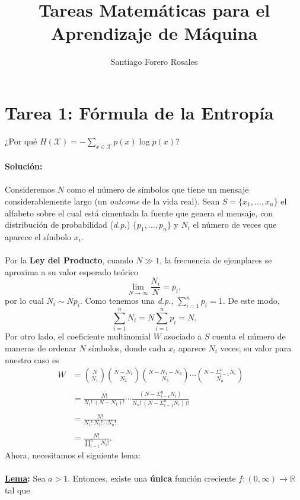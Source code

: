 \documentclass{article}
\title{Tareas Matemáticas para el Aprendizaje de Máquina}
\author{Santiago Forero Rosales}
\begin{document}
\maketitle
\tableofcontents
\newpage
\section{Tarea 1: Fórmula de la Entropía}
¿Por qué $H(\mathcal X) = - \sum_{x \in \mathcal X} p(x)\log p(x)$? \\ \\
\textbf{Solución:} \\ \\
Consideremos $N$ como el número de símbolos que tiene un mensaje considerablemente largo (un \textit{outcome} de la vida real). Sean $S = \{x_1,...,x_n\}$ el alfabeto sobre el cual está cimentada la fuente que genera el mensaje, con distribución de probabilidad (\textit{d.p.}) $\{p_1,...,p_n\}$ y $N_i$ el número de veces que aparece el símbolo $x_i$. \\ \\
Por la \textbf{Ley del Producto}, cuando $N\gg1$, la frecuencia de ejemplares se aproxima a su valor esperado teórico \[
\lim_{N \to \infty} \frac{N_i}{N} = p_i,
\] por lo cual $N_i \sim Np_i$. Como tenemos una \textit{d.p.}, $\sum_{i=1}^n p_i = 1$. De este modo, \[ \sum_{i=1}^n N_i = N \sum_{i=1}^n p_i = N.\]
Por otro lado, el coeficiente multinomial $W$ asociado a $S$ cuenta el número de maneras de ordenar $N$ símbolos, donde cada $x_i$ aparece $N_i$ veces; su valor para nuestro caso es
\begin{align*}
    W &= \binom{N}{N_1} \binom{N-N_1}{N_2} \binom{N-N_1-N_2}{N_3} \cdots \binom{N- \Sigma_{i=1}^n N_i}{N_n} &\\ \\
    & = \frac{N!}{N_1! \ (N-N_1)!} \cdots \frac{(N-\Sigma_{i=1}^n N_i)}{N_n! \ (N-\Sigma_{i=1}^n N_i))!} &\\ \\
    &= \frac{N!}{N_1! \ N_2! \cdots N_n!} &\\ \\
    &= \frac{N!}{\prod_{i=1}^n N_i!}.
\end{align*}
Ahora, necesitamos el siguiente lema: \\ \\
\textbf{\underline{Lema}:} Sea $a >1$. Entonces, existe una \textbf{única} función creciente $f:(0, \infty) \longrightarrow \mathbb{R}$ tal que \\ \\
\end{document}
